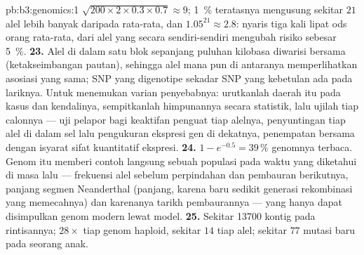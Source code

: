 \begin{solution}{pb:b3:genomics:1}
$\sqrt{200\times 2\times 0.3\times 0.7} \approx 9$; \qty{1}{\%} teratasnya
mengusung sekitar $21$ alel lebih banyak daripada rata-rata, dan $1.05^{21} \approx
2.8$: nyaris tiga kali lipat ods orang rata-rata, dari alel
yang secara sendiri-sendiri mengubah risiko sebesar \qty{5}{\%}.
\textbf{23.} Alel di dalam satu blok sepanjang puluhan kilobasa diwarisi
bersama (ketakseimbangan pautan), sehingga alel mana pun di antaranya
memperlihatkan asosiasi yang sama; SNP yang digenotipe sekadar SNP yang
kebetulan ada pada lariknya. Untuk menemukan varian penyebabnya: urutkanlah
daerah itu pada kasus dan kendalinya, sempitkanlah himpunannya secara
statistik, lalu ujilah tiap calonnya --- uji pelapor bagi keaktifan penguat
tiap alelnya, penyuntingan tiap alel di dalam sel lalu pengukuran ekspresi
gen di dekatnya, penempatan bersama dengan isyarat sifat kuantitatif
ekspresi.
\textbf{24.} $1 - e^{-0.5} = 39\,\%$ genomnya terbaca. Genom itu memberi
contoh langsung sebuah populasi pada waktu yang diketahui di masa lalu ---
frekuensi alel sebelum perpindahan dan pembauran berikutnya, panjang segmen
Neanderthal (panjang, karena baru sedikit generasi rekombinasi yang
memecahnya) dan karenanya tarikh pembaurannya --- yang hanya dapat disimpulkan
genom modern lewat model.
\textbf{25.} Sekitar \num{13700} kontig pada rintisannya; $28\times$ tiap
genom haploid, sekitar $14$  tiap alel; sekitar $77$ mutasi baru pada
seorang anak.
\end{solution}
